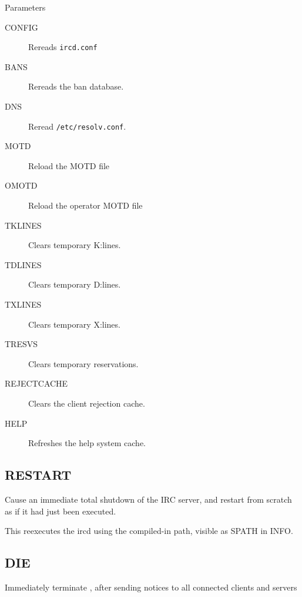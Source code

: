 {\sc Parameters}
\nopagebreak

\noindent
\begin{description}
\item[{CONFIG}]
	Rereads \nolinkurl{ircd.conf}

\item[{BANS}]
	Rereads the ban database.

\item[{DNS}]
	Reread \nolinkurl{/etc/resolv.conf}.

\item[{MOTD}]
	Reload the MOTD file

\item[{OMOTD}]
	Reload the operator MOTD file

\item[{TKLINES}]
	Clears temporary K:lines.

\item[{TDLINES}]
	Clears temporary D:lines.

\item[{TXLINES}]
	Clears temporary X:lines.

\item[{TRESVS}]
	Clears temporary reservations.

\item[{REJECTCACHE}]
	Clears the client rejection cache.

\item[{HELP}]
	Refreshes the help system cache.
\end{description}

\subsection{RESTART}


	Cause an immediate total shutdown of the IRC server, and restart from
	scratch as if it had just been executed.

	This reexecutes the ircd using the compiled-{}in path, visible as SPATH
	in INFO.


\subsection{DIE}

 

	Immediately terminate , after sending notices to all
	connected clients and servers


